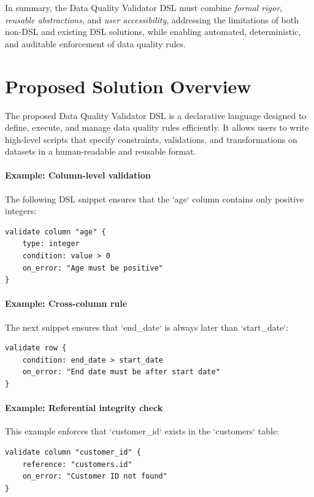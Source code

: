 \begin{itemize}[label=-, noitemsep]
In summary, the Data Quality Validator DSL must combine \emph{formal rigor}, \emph{reusable abstractions}, and \emph{user accessibility}, addressing the limitations of both non-DSL and existing DSL solutions, while enabling automated, deterministic, and auditable enforcement of data quality rules.

\section{Proposed Solution Overview}

The proposed Data Quality Validator DSL is a declarative language designed to define, execute, and manage data quality rules efficiently. 
It allows users to write high-level scripts that specify constraints, validations, and transformations on datasets in a human-readable and reusable format.

\paragraph{Example: Column-level validation}
The following DSL snippet ensures that the `age` column contains only positive integers:

\begin{verbatim}
validate column "age" {
    type: integer
    condition: value > 0
    on_error: "Age must be positive"
}
\end{verbatim}

\paragraph{Example: Cross-column rule}
The next snippet ensures that `end_date` is always later than `start_date`:

\begin{verbatim}
validate row {
    condition: end_date > start_date
    on_error: "End date must be after start date"
}
\end{verbatim}

\paragraph{Example: Referential integrity check}
This example enforces that `customer_id` exists in the `customers` table:

\begin{verbatim}
validate column "customer_id" {
    reference: "customers.id"
    on_error: "Customer ID not found"
}
\end{verbatim}


\end{itemize}
